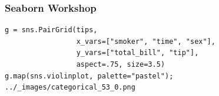 \documentclass{beamer}
\begin{document}
\begin{frame}[fragile]
	\frametitle{Seaborn Workshop}
	\large
	\begin{verbatim}
g = sns.PairGrid(tips,
                 x_vars=["smoker", "time", "sex"],
                 y_vars=["total_bill", "tip"],
                 aspect=.75, size=3.5)
g.map(sns.violinplot, palette="pastel");
../_images/categorical_53_0.png
\end{verbatim}
\end{frame}
\end{document}
